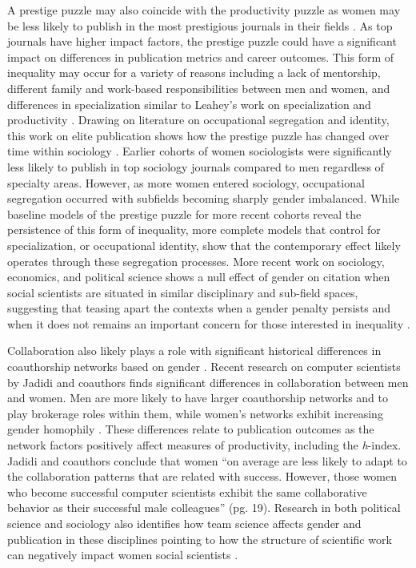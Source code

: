 \documentclass[
  10pt,
  letterpaper,
]{article}
\begin{document}
A prestige puzzle may also coincide with the productivity puzzle as
women may be less likely to publish in the most prestigious journals in
their fields \citep{light_gender_2013}. As top journals have higher
impact factors, the prestige puzzle could have a significant impact on
differences in publication metrics and career outcomes. This form of
inequality may occur for a variety of reasons including a lack of
mentorship, different family and work-based responsibilities between men
and women, and differences in specialization similar to Leahey's work on
specialization and productivity
\citep{leahey_gender_2006, leahey_not_2007, light_gender_2009}. Drawing
on literature on occupational segregation and identity, this work on
elite publication shows how the prestige puzzle has changed over time
within sociology \citep{light_gender_2009}. Earlier cohorts of women
sociologists were significantly less likely to publish in top sociology
journals compared to men regardless of specialty areas. However, as more
women entered sociology, occupational segregation occurred with
subfields becoming sharply gender imbalanced. While baseline models of
the prestige puzzle for more recent cohorts reveal the persistence of
this form of inequality, more complete models that control for
specialization, or occupational identity, show that the contemporary
effect likely operates through these segregation processes. More recent
work on sociology, economics, and political science shows a null effect
of gender on citation when social scientists are situated in similar
disciplinary and sub-field spaces, suggesting that teasing apart the
contexts when a gender penalty persists and when it does not remains an
important concern for those interested in inequality
\citep{lynn_rare_2019}.

Collaboration also likely plays a role with significant historical
differences in coauthorship networks based on gender
\citep{moody_structure_2004}. Recent research on computer scientists by
Jadidi and coauthors finds significant differences in collaboration
between men and women. Men are more likely to have larger coauthorship
networks and to play brokerage roles within them, while women's networks
exhibit increasing gender homophily \citep{jadidi_gender_2018}. These
differences relate to publication outcomes as the network factors
positively affect measures of productivity, including the
\emph{h}-index. Jadidi and coauthors conclude that women ``on average
are less likely to adapt to the collaboration patterns that are related
with success. However, those women who become successful computer
scientists exhibit the same collaborative behavior as their successful
male colleagues'' (pg. 19). Research in both political science and
sociology also identifies how team science affects gender and
publication in these disciplines pointing to how the structure of
scientific work can negatively impact women social scientists
\citep{akbaritabar_gender_2021, teele_gender_2017}.
\end{document}
